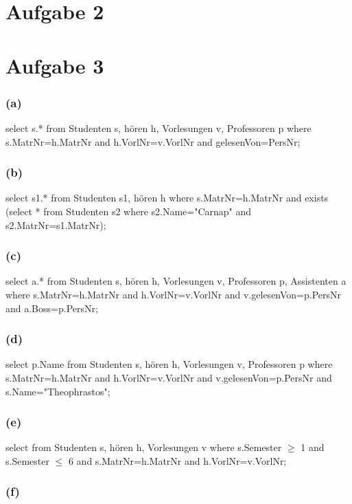 \documentclass{article}
\begin{document}
\section*{Aufgabe 2}

\section*{Aufgabe 3}

\subsubsection*{(a)}

select s.* from Studenten s, hören h, Vorlesungen v, Professoren p where
s.MatrNr=h.MatrNr and h.VorlNr=v.VorlNr and gelesenVon=PersNr;

\subsubsection*{(b)}

select s1.* from Studenten s1, hören h where s.MatrNr=h.MatrNr and exists (select * from Studenten s2 where s2.Name="Carnap" and s2.MatrNr=s1.MatrNr);

\subsubsection*{(c)}

select a.* from Studenten s, hören h, Vorlesungen v, Professoren p, Assistenten a where s.MatrNr=h.MatrNr and h.VorlNr=v.VorlNr and v.gelesenVon=p.PersNr and a.Boss=p.PersNr;

\subsubsection*{(d)}

select p.Name from Studenten s, hören h, Vorlesungen v, Professoren p where s.MatrNr=h.MatrNr and h.VorlNr=v.VorlNr and v.gelesenVon=p.PersNr and s.Name="Theophrastos";

\subsubsection*{(e)}

select from Studenten s, hören h, Vorlesungen v where s.Semester $\ge$ 1 and s.Semester $\le$ 6 and s.MatrNr=h.MatrNr and h.VorlNr=v.VorlNr;

\subsubsection*{(f)}
\end{document}
